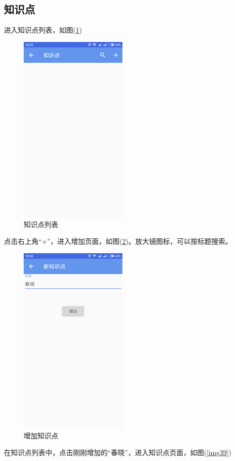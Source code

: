 \subsection{知识点}
进入知识点列表，如图(\ref{img37})
\begin{figure}[H]
	\centering
	\includegraphics{img/37.png}
	\caption{知识点列表}
	\label{img37}
\end{figure}
点击右上角“+”，进入增加页面，如图(\ref{img38})。放大镜图标，可以按标题搜索。
\begin{figure}[H]
	\centering
	\includegraphics{img/38.png}
	\caption{增加知识点}
	\label{img38}
\end{figure}
在知识点列表中，点击刚刚增加的“春晓”，进入知识点页面，如图(\ref{img39})
